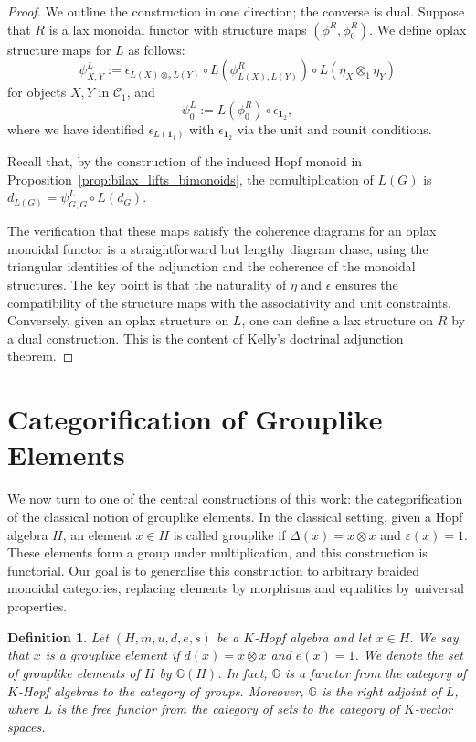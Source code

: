 \documentclass{amsart}
\newtheorem{definition}{Definition}[section]
\begin{document}
\begin{proof}
We outline the construction in one direction; the converse is dual. Suppose that $R$ is a lax monoidal functor with structure maps $(\phi^R, \phi_0^R)$. We define oplax structure maps for $L$ as follows:
\[
\psi^L_{X,Y} := \epsilon_{L(X) \otimes_2 L(Y)} \circ L(\phi^R_{L(X), L(Y)}) \circ L(\eta_X \otimes_1 \eta_Y)
\]
for objects $X, Y$ in $\mathcal{C}_1$, and
\[
\psi^L_0 := L(\phi_0^R) \circ \epsilon_{\mathbf{1}_2},
\]
where we have identified $\epsilon_{L(\mathbf{1}_1)}$ with $\epsilon_{\mathbf{1}_2}$ via the unit and counit conditions.

Recall that, by the construction of the induced Hopf monoid in Proposition~\ref{prop:bilax_lifts_bimonoids}, the comultiplication of \( L(G) \) is \( d_{L(G)} = \psi^L_{G,G} \circ L(d_G) \).

The verification that these maps satisfy the coherence diagrams for an oplax monoidal functor is a straightforward but lengthy diagram chase, using the triangular identities of the adjunction and the coherence of the monoidal structures. The key point is that the naturality of $\eta$ and $\epsilon$ ensures the compatibility of the structure maps with the associativity and unit constraints. Conversely, given an oplax structure on $L$, one can define a lax structure on $R$ by a dual construction. This is the content of Kelly's doctrinal adjunction theorem.
\end{proof}

\section{Categorification of Grouplike Elements}\label{sec:grouplike}

We now turn to one of the central constructions of this work: the categorification of the classical notion of grouplike elements. In the classical setting, given a Hopf algebra $H$, an element $x \in H$ is called grouplike if $\Delta(x) = x \otimes x$ and $\varepsilon(x) = 1$. These elements form a group under multiplication, and this construction is functorial. Our goal is to generalise this construction to arbitrary braided monoidal categories, replacing elements by morphisms and equalities by universal properties.

\begin{definition}\label{def:grouplike_classical}
Let $(H, m, u, d, e, s)$ be a $K$-Hopf algebra and let $x \in H$. We say that $x$ is a grouplike element if $d(x) = x \otimes x$ and $e(x) = 1$. We denote the set of grouplike elements of $H$ by $\mathbb{G}(H)$. In fact, $\mathbb{G}$ is a functor from the category of $K$-Hopf algebras to the category of groups. Moreover, $\mathbb{G}$ is the right adjoint of $\widehat{L}$, where $L$ is the free functor from the category of sets to the category of $K$-vector spaces.
\end{definition}
\end{document}
